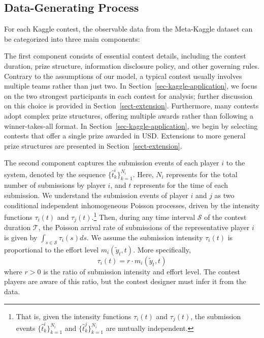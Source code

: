 \documentclass[mnsc]{informs3}
\begin{document}
\subsection{Data-Generating Process}

For each Kaggle contest, the observable data from the Meta-Kaggle dataset can be categorized into three main components:

The first component consists of essential contest details, including the contest duration, prize structure, information disclosure policy, and other governing rules.
Contrary to the assumptions of our model, a typical contest usually involves multiple teams rather than just two.
In Section~\ref{sec-kaggle-application}, we focus on the two strongest participants in each contest for analysis; further discussion on this choice is provided in Section~\ref{sect-extension}.
Furthermore, many contests adopt complex prize structures, offering multiple awards rather than following a winner-takes-all format.
In Section~\ref{sec-kaggle-application}, we begin by selecting contests that offer a single prize awarded in USD.
Extensions to more general prize structures are presented in Section~\ref{sect-extension}.

The second component captures the submission events of each player $i$ to the system, denoted by the sequence $\{\hat{t}^i_k\}_{k=1}^{N_i}$.
Here, $N_i$ represents for the total number of submissions by player $i$, and $t$ represents for the time of each submission. 
We understand the submission events of player $i$ and $j$ as two conditional independent inhomogeneous Poisson processes, driven by the intensity functions $\tau_i(t)$ and $\tau_j(t)$.\footnote{That is, given the intensity functions $\tau_i(t)$ and $\tau_j(t)$, the submission events $\{\hat{t}^i_k\}_{k=1}^{N_i}$ and $\{\hat{t}^j_k\}_{k=1}^{N_i}$ are mutually independent.}
Then, during any time interval $\mathcal{S}$ of the contest duration $\mathcal{T}$, the Poisson arrival rate of submissions of the representative player $i$ is given by $\int_{s\in\mathcal{S}}\tau_i(s)ds$. 
We assume the submission intensity $\tau_i(t)$ is proportional to the effort level $m_i(\tilde{y}_t, t)$. More specifically, 
\begin{equation}\label{eq-model-intensity}
\tau_i(t) = r \cdot m_i(\tilde{y}_t, t)
\end{equation}
where $r>0$ is the ratio of submission intensity and effort level. 
The contest players are aware of this ratio, but the contest designer must infer it from the data. 
\end{document}
